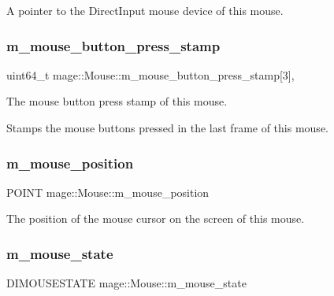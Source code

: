 A pointer to the Direct\+Input mouse device of this mouse. \hypertarget{classmage_1_1_mouse_a0f5a38e23bdf7eae1b7b1030a53edff0}{}\label{classmage_1_1_mouse_a0f5a38e23bdf7eae1b7b1030a53edff0} 
\subsubsection{\texorpdfstring{m\+\_\+mouse\+\_\+button\+\_\+press\+\_\+stamp}{m\_mouse\_button\_press\_stamp}}
{\footnotesize\ttfamily uint64\+\_\+t mage\+::\+Mouse\+::m\+\_\+mouse\+\_\+button\+\_\+press\+\_\+stamp\mbox{[}3\mbox{]}\hspace{0.3cm}{\ttfamily [mutable]}, {\ttfamily [private]}}

The mouse button press stamp of this mouse.

Stamps the mouse buttons pressed in the last frame of this mouse. \hypertarget{classmage_1_1_mouse_a2a8332ef7a4daa0f9ed48a9a1ad80684}{}\label{classmage_1_1_mouse_a2a8332ef7a4daa0f9ed48a9a1ad80684} 
\subsubsection{\texorpdfstring{m\+\_\+mouse\+\_\+position}{m\_mouse\_position}}
{\footnotesize\ttfamily P\+O\+I\+NT mage\+::\+Mouse\+::m\+\_\+mouse\+\_\+position\hspace{0.3cm}{\ttfamily [private]}}

The position of the mouse cursor on the screen of this mouse. \hypertarget{classmage_1_1_mouse_af99645fb4226077abee4532a5e663066}{}\label{classmage_1_1_mouse_af99645fb4226077abee4532a5e663066} 
\subsubsection{\texorpdfstring{m\+\_\+mouse\+\_\+state}{m\_mouse\_state}}
{\footnotesize\ttfamily D\+I\+M\+O\+U\+S\+E\+S\+T\+A\+TE mage\+::\+Mouse\+::m\+\_\+mouse\+\_\+state\hspace{0.3cm}{\ttfamily [private]}}

